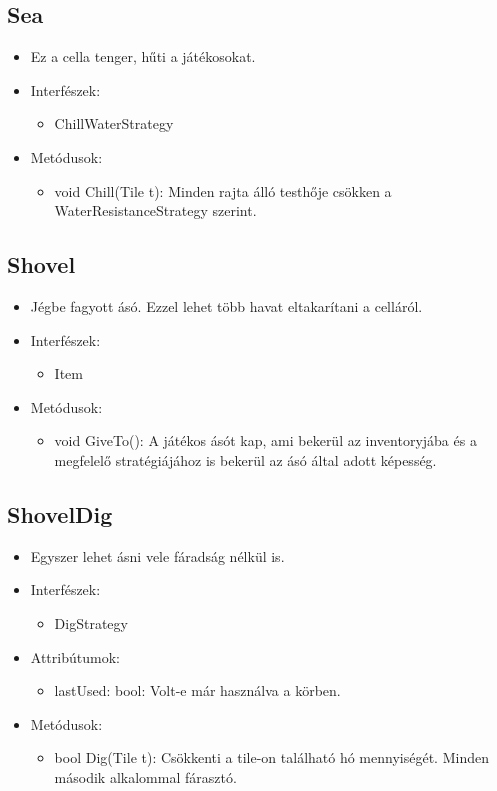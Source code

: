 \subsection{Sea}
\begin{itemize}
	\item Ez a cella tenger, hűti a játékosokat.
	\item Interfészek:
	\begin{itemize}
		\item ChillWaterStrategy
	\end{itemize}
	\item Metódusok:
	\begin{itemize}
		\item void Chill(Tile t): Minden rajta álló testhője csökken a WaterResistanceStrategy szerint.
	\end{itemize}
\end{itemize}

\subsection{Shovel}
\begin{itemize}
	\item Jégbe fagyott ásó. Ezzel lehet több havat eltakarítani a celláról.
	\item Interfészek:
	\begin{itemize}
		\item Item
	\end{itemize}
	\item Metódusok:
	\begin{itemize}
		\item void GiveTo(): A játékos ásót kap, ami bekerül az inventoryjába és a megfelelő stratégiájához is bekerül az ásó által adott képesség.
	\end{itemize}
\end{itemize}

\subsection{ShovelDig}
\begin{itemize}
	\item Egyszer lehet ásni vele fáradság nélkül is.
	\item Interfészek:
	\begin{itemize}
		\item DigStrategy
	\end{itemize}
	\item Attribútumok:
	\begin{itemize}
		\item lastUsed: bool: Volt-e már használva a körben.
	\end{itemize}
	\item Metódusok:
	\begin{itemize}
		\item bool Dig(Tile t): Csökkenti a tile-on található hó mennyiségét. Minden második alkalommal fárasztó.
	\end{itemize}
\end{itemize}

